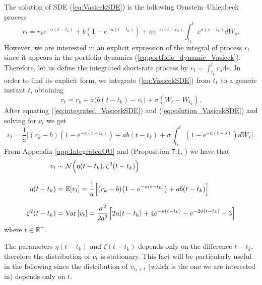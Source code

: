 The solution of \gls{SDE} (\ref{eq:VasicekSDE}) is the following Ornstein–Uhlenbeck process
\begin{equation}\label{eq:solution_VasicekSDE}
r_t = r_ke^{-a(t-t_k)}+b(1-e^{-a(t-t_k)}) + \sigma e^{-a(t-t_k)}\int_{t_k}^{t}e^{a(s-t_k)}dW_s.
\end{equation}
However, we are interested in an explicit expression of the integral of process $r_t$ since it appears in the portfolio dynamics (\ref{eq:portfolio_dynamic_Vasicek}). Therefore, let us define the integrated short-rate process by $v_t=\int_{t_k}^{t}r_s\mathrm{d}s$. In order to find its explicit form, we integrate (\ref{eq:VasicekSDE}) from $t_k$ to a generic instant $t$, obtaining
\begin{equation}\label{eq:integrated_VasicekSDE}
r_t = r_k + a\big(b(t-t_k) - v_t\big) + \sigma(W_t-W_{t_k}).
\end{equation}
After equating (\ref{eq:integrated_VasicekSDE}) and (\ref{eq:solution_VasicekSDE}) and solving for $v_t$ we get
\begin{equation}\label{eq:v_t}
v_t = \frac{1}{a}\Big[(r_k-b)(1-e^{-a(t-t_k)})+ab(t-t_k)+\sigma\int_{t_k}^{t}(1-e^{-a(t-s)})dW_s\Big].
\end{equation}
From Appendix \ref{app:IntegratedOU} and (Proposition 7.1, \cite{baldi2017}) we have that
\begin{align}
\nonumber
v_t & \sim \mathcal{N}\Big(\eta(t-t_k),\zeta^2(t-t_k)\Big)\\[2ex]
\label{eq:Vasicek_mean}
\eta(t-t_k) & = \mathbb{E}[v_t]= \frac{1}{a}\Big[(r_k - b)\big(1-e^{-a(t-t_k)}\big)+ab(t-t_k)\Big]\\[2ex]
\label{eq:Vasicek_variance}
\zeta^2(t-t_k) & = \operatorname{Var}\left[v_t\right]= \frac{\sigma^2}{2a^3}\Big[2a(t-t_k) + 4e^{-a(t-t_k)}-e^{-2a(t-t_k)}-3\Big]
\end{align}
where $t \in \mathbb{R}^{+}$.
\begin{remark}
	The parameters $\eta(t-t_k)$ and $\zeta(t-t_k)$ depends only on the difference $t-t_k$, therefore the distribution of $v_t$ is stationary. This fact will be particularly useful in the following since the distribution of $v_{t_k+t}$ (which is the one we are interested in) depends only on $t$.
\end{remark}
